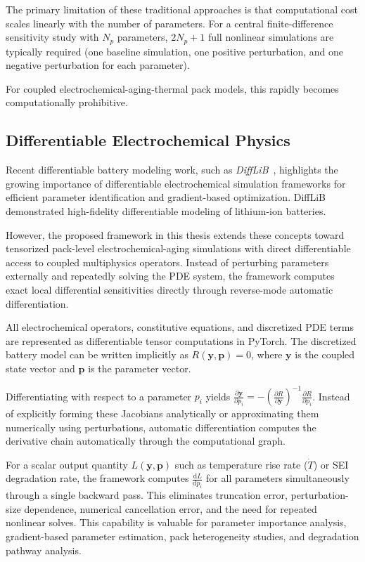 The primary limitation of these traditional approaches is that computational cost scales linearly with the number of parameters. For a central finite-difference sensitivity study with $N_p$ parameters, $2N_p + 1$ full nonlinear simulations are typically required (one baseline simulation, one positive perturbation, and one negative perturbation for each parameter).

For coupled electrochemical-aging-thermal pack models, this rapidly becomes computationally prohibitive. 

\subsection{Differentiable Electrochemical Physics}
\label{ssec:lit_differentiable_physics}

Recent differentiable battery modeling work, such as \emph{DiffLiB}~\cite{Wang2024}, highlights the growing importance of differentiable electrochemical simulation frameworks for efficient parameter identification and gradient-based optimization. DiffLiB demonstrated high-fidelity differentiable modeling of lithium-ion batteries.

However, the proposed framework in this thesis extends these concepts toward tensorized pack-level electrochemical-aging simulations with direct differentiable access to coupled multiphysics operators. Instead of perturbing parameters externally and repeatedly solving the PDE system, the framework computes exact local differential sensitivities directly through reverse-mode automatic differentiation. 

All electrochemical operators, constitutive equations, and discretized PDE terms are represented as differentiable tensor computations in PyTorch. The discretized battery model can be written implicitly as $R(\mathbf{y}, \mathbf{p})=0$, where $\mathbf{y}$ is the coupled state vector and $\mathbf{p}$ is the parameter vector.

Differentiating with respect to a parameter $p_i$ yields $\frac{\partial \mathbf{y}}{\partial p_i} = - \left( \frac{\partial R}{\partial \mathbf{y}} \right)^{-1} \frac{\partial R}{\partial p_i}$. Instead of explicitly forming these Jacobians analytically or approximating them numerically using perturbations, automatic differentiation computes the derivative chain automatically through the computational graph. 

For a scalar output quantity $L(\mathbf{y},\mathbf{p})$ such as temperature rise rate ($\dot{T}$) or SEI degradation rate, the framework computes $\frac{\mathrm{d}L}{\mathrm{d}p_i}$ for all parameters simultaneously through a single backward pass. This eliminates truncation error, perturbation-size dependence, numerical cancellation error, and the need for repeated nonlinear solves. This capability is valuable for parameter importance analysis, gradient-based parameter estimation, pack heterogeneity studies, and degradation pathway analysis.

